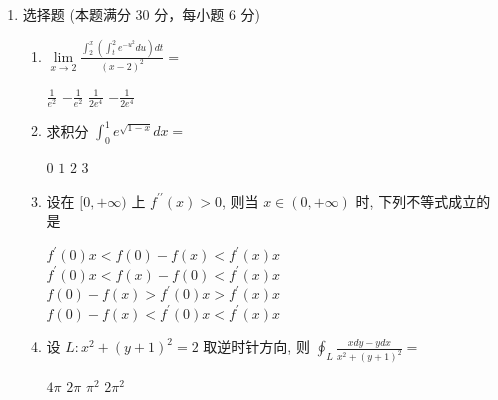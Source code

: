 \begin{enumerate}
{	\par\vspace{1mm}\noindent
	\textbf{注：}{\kaishu
	第 (1) 小题原答案作 $\tan\frac1x$，有误：
	$\left(\ln\sin u\right)'=\cot u$，故应为 $\cot\frac1x$。
	以 $x=0.7$ 数值求导得 $\frac{y'}{y}=0.428300$，而含 $\cot$ 的表达式给出 $0.428300$、
	含 $\tan$ 的给出 $-0.153371$，确认原答案有误。

	第 (4) 小题原有“可能有问题，后期重算”的批注，现已复核：答案
	$\frac{x+1}{16}=\frac{y}{19}=\frac{z-4}{28}$ 正确。
	旁注中提出的 $\frac{x+1}{8}=\frac{y}{17}=\frac{z-4}{4}$ 虽与 $L$ 相交，
	但 $(8,17,4)\cdot(3,-4,1)=-40\neq0$，并不平行于所给平面，故不合题意。
	}\par
}


\item
选择题 (本题满分 30 分，每小题 6 分)
\begin{enumerate}
	\item
	$ \lim\limits _{x \rightarrow 2} \frac{\int_{2}^{x}\left(\int_{t}^{2} e^{-u^{2}} du \right) d t}{(x-2)^{2}}=$  
	
	
\fourchoices
{$\frac{1}{e^{2}}$}
{$-\frac{1}{e^{2}}$}
{$\frac{1}{2 e^{4}}$}
{$-\frac{1}{2 e^{4}}$}

	
	
	\item
	求积分 $\int_{0}^{1} e^{\sqrt{1-x}} d x=$  
	
	
\fourchoices
{$ 0 $}
{$ 1 $}
{$ 2 $}
{$ 3 $}


\item
设在 $[0,+\infty)$ 上 $f^{\prime \prime}(x)>0$, 则当 $x \in(0,+\infty)$ 时, 下列不等式成立的是  


\fourchoices
{$f^{\prime}(0) x<f(0)-f(x)<f^{\prime}(x) x$}
{$f^{\prime}(0) x<f(x)-f(0)<f^{\prime}(x)x$}
{$f(0)-f(x)>f^{\prime}(0) x>f^{\prime}(x)x$}
{$f(0)-f(x)<f^{\prime}(0) x<f^{\prime}(x)x$}




\item
设 $L: x^{2}+(y+1)^{2}=2$ 取逆时针方向, 则 $\oint_{L} \frac{x d y-y d x}{x^{2}+(y+1)^{2}}=$  


\fourchoices
{$4 \pi$}
{$2 \pi$}
{$\pi^{2}$}
{$2 \pi^{2}$}




\end{enumerate}
\end{enumerate}
